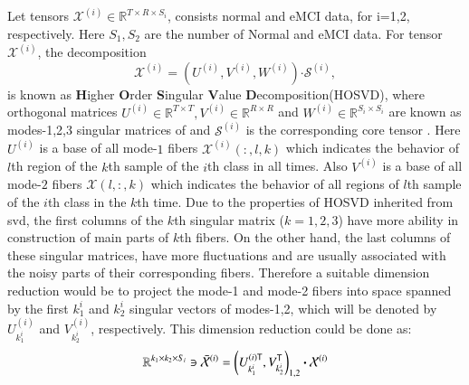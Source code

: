 \documentclass[preprint,12pt]{elsarticle}
\begin{document}
	Let tensors $\mathcal{X}^{(i)}\in \mathbb{R}^{T\times R \times S_i}$, consists normal and eMCI data, for i=1,2, respectively.  Here $S_1,S_2$ are the number of Normal and eMCI data.
	For tensor $\mathcal{X}^{(i)}$, the decomposition
	\begin{equation}
	\label{ho}
	\mathcal{X}^{(i)} = 
	\left(  
	U^{(i)},V^{(i)},W^{(i)}
	\right)\boldsymbol{\cdot} \mathcal{S}^{(i)},
	\end{equation}
	is known as \textbf{H}igher \textbf{O}rder \textbf{S}ingular \textbf{V}alue \textbf{D}ecomposition(HOSVD),
	where orthogonal matrices $U^{(i)}\in \mathbb{R}^{T\times T}, V^{(i)}\in \mathbb{R}^{R\times R} $ and $W^{(i)}\in \mathbb{R}^{S_i\times S_i}$ are known as modes-1,2,3 singular matrices of 
	and $\mathcal{S}^{(i)}$ is the corresponding core tensor \cite{r64}.  Here $U^{(i)}$ is a base of all mode-$ 1 $ fibers $\mathcal{X}^{(i)}(:,l,k)$
	which indicates the behavior of $l$th region of the $k$th sample of the $i$th class in all times. Also  $V^{(i)}$ is a base of all mode-$ 2 $ fibers $\mathcal{X}(l,:,k)$ which indicates the behavior of all regions of  $l$th  sample of the $i$th class in  the $k$th time.
	Due to the properties of HOSVD inherited from svd, the first columns of the $k$th singular matrix ($k = 1,2,3$) have more ability in construction of main parts of $k$th fibers. On the other hand, the last columns of these singular matrices, have more fluctuations and are usually associated with the noisy parts of their corresponding fibers\cite{r64}. 
	Therefore a suitable dimension reduction would be to project the mode-1 and mode-2 fibers into space spanned by the first $k^i_1$ and $k^i_2$ singular vectors of modes-1,2, which will be denoted by $U^{(i)}_{k^i_1}$ and $V_{k^i_2}^{(i)}$, respectively. This dimension reduction could be done as:
	\begin{align}
	\label{m1}
	\mathbb{R}^{k_1 \times k_2 \times S_i} \ni  \bar{{\mathcal{X}}}^{(i)} = \left( 
	U^{(i) {\sf {T}}}_{k^i_1}, V_{k^i_2}^{\sf {T}}
	\right)_{1,2}\boldsymbol{\cdot} \mathcal{X}^{(i)}
	\end{align}
\end{document}
